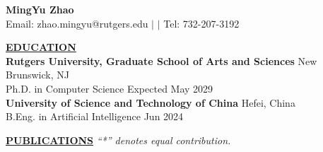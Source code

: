 \documentclass{article}
\begin{document}
\begin{center}
\thispagestyle{empty}
\huge \textbf{MingYu Zhao\\}
\vspace{10pt}
\normalsize Email: zhao.mingyu@rutgers.edu $\mid$ \href{https://illuminatingfish.github.io/}{\color{blue}{Homepage}} $\mid$ Tel: 732-207-3192 \\
\hrulefill
\end{center}

\vspace{-6pt}

\noindent \textbf{\underline{EDUCATION}} \\
\textbf{Rutgers University, Graduate School of Arts and Sciences} \hfill New Brunswick, NJ\\
Ph.D. in Computer Science \hfill Expected May 2029\\
\textbf{University of Science and Technology of China} \hfill Hefei, China\\
B.Eng. in Artificial Intelligence \hfill Jun 2024\\

\vspace{-9pt}



\noindent \textbf{\underline{PUBLICATIONS}} \small \textit{``*'' denotes equal contribution.} \normalsize
\end{document}
